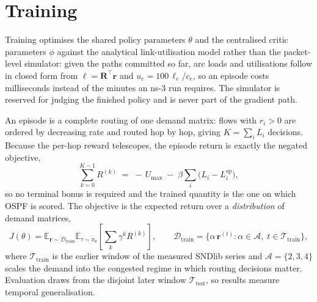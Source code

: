 \section{Training}

Training optimises the shared policy parameters $\theta$ and the centralised critic parameters
$\phi$ against the analytical link-utilisation model rather than the packet-level simulator:
given the paths committed so far, arc loads and utilisations follow in closed form from
$\boldsymbol{\ell} = \mathbf{R}^{\!\top}\mathbf{r}$ and $u_e = 100\,\ell_e/c_e$, so an episode
costs milliseconds instead of the minutes an \mbox{ns-3} run requires. The simulator is reserved
for judging the finished policy and is never part of the gradient path.

An episode is a complete routing of one demand matrix: flows with $r_i > 0$ are ordered by
decreasing rate and routed hop by hop, giving $K = \sum_i L_i$ decisions. Because the per-hop
reward telescopes, the episode return is exactly the negated objective,
\begin{equation}
\sum_{k=0}^{K-1} R^{(k)} \;=\; -\,U_{\max} \;-\; \beta \sum_i \bigl(L_i - L_i^{\mathrm{sp}}\bigr),
\end{equation}
so no terminal bonus is required and the trained quantity is the one on which OSPF is scored.
The objective is the expected return over a \emph{distribution} of demand matrices,
\begin{equation}
J(\theta) = \mathbb{E}_{\mathbf{r} \sim \mathcal{D}_{\mathrm{train}}}
\mathbb{E}_{\tau \sim \pi_\theta}\!\left[\sum_{k} \gamma^{k} R^{(k)}\right],
\qquad
\mathcal{D}_{\mathrm{train}} = \bigl\{\alpha\,\mathbf{r}^{(t)} : \alpha \in \mathcal{A},\;
t \in \mathcal{T}_{\mathrm{train}}\bigr\},
\end{equation}
where $\mathcal{T}_{\mathrm{train}}$ is the earlier window of the measured SNDlib series and
$\mathcal{A} = \{2,3,4\}$ scales the demand into the congested regime in which routing decisions
matter. Evaluation draws from the disjoint later window $\mathcal{T}_{\mathrm{test}}$, so results
measure temporal generalisation.


